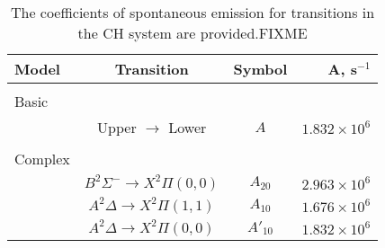\begin{table}
  \caption[Einstein A coefficients]{The coefficients of spontaneous emission for transitions in the CH system are provided.FIXME}
  \begin{center}
    \begin{tabular}{lccr}
      Model & Transition & Symbol & A, s\(^{-1}\) \tabularnewline
      \hline\hline
      & & & \tabularnewline
      Basic & & & \tabularnewline
      \hline
      & Upper \(\rightarrow\) Lower & \(A\) & \(1.832 \times 10^6\) \tabularnewline
      & & & \tabularnewline
      Complex & & & \tabularnewline
      \hline
      & \(B^2\Sigma^-\rightarrow X^2\Pi(0,0)\) & \(A_{20}\) & \(2.963 \times 10^6\) \tabularnewline
      & \(A^2\Delta\rightarrow X^2\Pi(1,1)\) & \(A_{10}\) & \(1.676 \times 10^6\) \tabularnewline
      & \(A^2\Delta\rightarrow X^2\Pi(0,0)\) & \(A'_{10}\) & \(1.832 \times 10^6\) \tabularnewline
      \hline
    \end{tabular}
  \end{center}
  \label{tab:emissionCoefficients}
\end{table}

